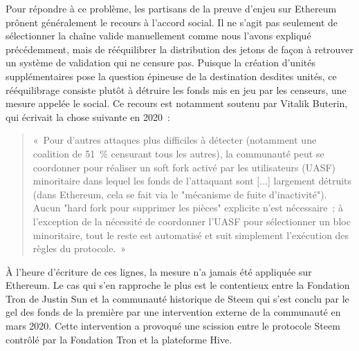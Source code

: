 
Pour répondre à ce problème, les partisans de la preuve d'enjeu sur Ethereum prônent généralement le recours à l'accord social. Il ne s'agit pas seulement de sélectionner la chaîne valide manuellement comme nous l'avons expliqué précédemment, mais de rééquilibrer la distribution des jetons de façon à retrouver un système de validation qui ne censure pas. Puisque la création d'unités supplémentaires pose la question épineuse de la destination desdites unités, ce rééquilibrage consiste plutôt à détruire les fonds mis en jeu par les censeurs, une mesure appelée le  social. Ce recours est notamment soutenu par Vitalik Buterin, qui écrivait la chose suivante en 2020~:

\begin{quote}
«~Pour d'autres attaques plus difficiles à détecter (notamment une coalition de 51~\% censurant tous les autres), la communauté peut se coordonner pour réaliser un soft fork activé par les utilisateurs (UASF) minoritaire dans lequel les fonds de l'attaquant sont [...] largement détruits (dans Ethereum, cela se fait via le "mécanisme de fuite d'inactivité"). Aucun "hard fork pour supprimer les pièces" explicite n'est nécessaire~; à l'exception de la nécessité de coordonner l'UASF pour sélectionner un bloc minoritaire, tout le reste est automatisé et suit simplement l'exécution des règles du protocole.~»
\end{quote}


À l'heure d'écriture de ces lignes, la mesure n'a jamais été appliquée sur Ethereum. Le cas qui s'en rapproche le plus est le contentieux entre la Fondation Tron de Justin Sun et la communauté historique de Steem qui s'est conclu par le gel des fonds de la première par une intervention externe de la communauté en mars 2020. Cette intervention a provoqué une scission entre le protocole Steem contrôlé par la Fondation Tron et la plateforme Hive.

